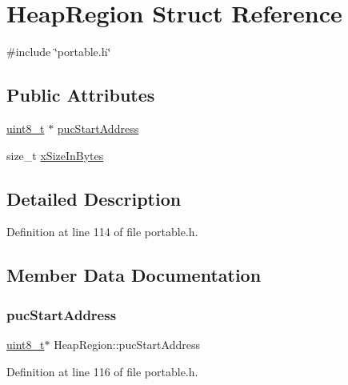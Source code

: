 \hypertarget{structHeapRegion}{}\section{Heap\+Region Struct Reference}
\label{structHeapRegion}


{\ttfamily \#include \char`\"{}portable.\+h\char`\"{}}

\subsection*{Public Attributes}
\begin{DoxyCompactItemize}
\item 
\hyperlink{stdint_8h_aba7bc1797add20fe3efdf37ced1182c5}{uint8\+\_\+t} $\ast$ \hyperlink{structHeapRegion_aab323508c34642ebfb884a68441d97fc}{puc\+Start\+Address}
\item 
size\+\_\+t \hyperlink{structHeapRegion_a5933b0fd422e70a92ceef839b89a757f}{x\+Size\+In\+Bytes}
\end{DoxyCompactItemize}


\subsection{Detailed Description}


Definition at line 114 of file portable.\+h.



\subsection{Member Data Documentation}
\mbox{\label{structHeapRegion_aab323508c34642ebfb884a68441d97fc}} 
\subsubsection{\texorpdfstring{puc\+Start\+Address}{pucStartAddress}}
{\footnotesize\ttfamily \hyperlink{stdint_8h_aba7bc1797add20fe3efdf37ced1182c5}{uint8\+\_\+t}$\ast$ Heap\+Region\+::puc\+Start\+Address}



Definition at line 116 of file portable.\+h.

\mbox{\label{structHeapRegion_a5933b0fd422e70a92ceef839b89a757f}} 
